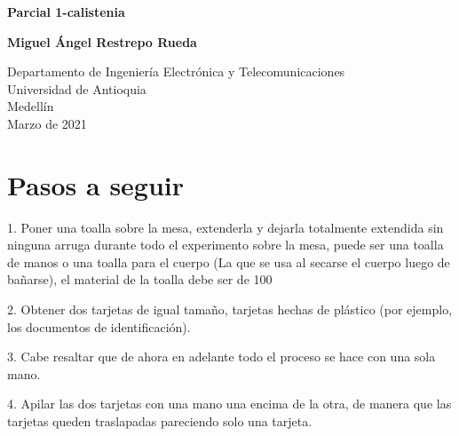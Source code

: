 \documentclass{article}
\begin{document}
\begin{titlepage}
    \begin{center}
        \vspace*{1cm}
            
        \Huge
        \textbf{Parcial 1-calistenia}
            
        \vspace{0.5cm}
        \LARGE
        
            
        \vspace{1.5cm}
            
        \textbf{Miguel Ángel Restrepo Rueda}
            
        \vfill
            
        \vspace{0.8cm}
            
        \Large
        Departamento de Ingeniería Electrónica y Telecomunicaciones\\
        Universidad de Antioquia\\
        Medellín\\
        Marzo de 2021
            
    \end{center}
\end{titlepage}

\tableofcontents
\newpage
\section{Pasos a seguir}\label{Pasos a seguir} 

 1.	Poner una toalla sobre la mesa, extenderla y dejarla totalmente extendida sin ninguna arruga durante todo el experimento sobre la mesa, puede ser una toalla de manos o una toalla para el cuerpo (La que se usa al secarse el cuerpo luego de bañarse), el material de la toalla debe ser de 100%

 2.	Obtener dos tarjetas de igual tamaño, tarjetas hechas de plástico (por ejemplo, los documentos de identificación). \newline \newline

 3.	Cabe resaltar que de ahora en adelante todo el proceso se hace con una sola mano. \newline \newline

 4.	Apilar las dos tarjetas con una mano una encima de la otra, de manera que las tarjetas queden traslapadas pareciendo solo una tarjeta. \newline \newline
\end{document}

